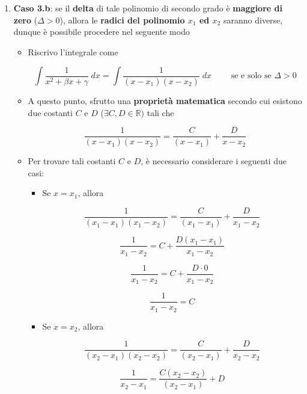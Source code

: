 \documentclass[a4paper, 12pt]{report}
\begin{document}
\begin{enumerate}
\begin{enumerate}
                \item \textbf{Caso 3.b}: se il \textbf{delta} di tale polinomio di secondo grado è \textbf{maggiore di zero} ($\Delta > 0$), allora le \textbf{radici del polinomio $x_1$ ed $x_2$} saranno diverse, dunque è possibile procedere nel seguente modo
                
                \begin{itemize}
                    \item Riscrivo l'integrale come
                    
                    \[ \int \frac{1}{x^2 + \beta x + \gamma} \; dx = \int \frac{1}{(x-x_1)(x-x_2)} \; dx \qquad \text{ se e solo se } \Delta > 0\]
                    
                    \item A questo punto, sfrutto una \textbf{proprietà matematica} secondo cui esistono due costanti $C$ e $D$ ($\exists C, D \in \mathbb{R})$ tali che
                    
                    \[ \frac{1}{(x-x_1)(x-x_2)} = \frac{C}{(x-x_1)}+ \frac{D}{x-x_2}\]
                
                    \item Per trovare tali costanti $C$ e $D$, è necessario considerare i seguenti due casi:
                    
                    \begin{itemize}
                        \item Se $x = x_1$, allora
                        
                        \[ \frac{1}{(x_1-x_1)(x_1-x_2)} = \frac{C}{(x_1-x_1)}+ \frac{D}{x_1-x_2}\]
                        
                        \[ \frac{1}{x_1-x_2} = C+ \frac{D(x_1-x_1)}{x_1-x_2}\]
                        
                        \[ \frac{1}{x_1-x_2} = C+ \frac{D \cdot 0}{x_1-x_2}\]
                        
                        \[ \frac{1}{x_1-x_2} = C\]
                        
                        \item Se $x = x_2$, allora
                        
                        \[ \frac{1}{(x_2-x_1)(x_2-x_2)} = \frac{C}{(x_2-x_1)}+ \frac{D}{x_2-x_2}\]
                        
                        \[ \frac{1}{x_2-x_1} = \frac{C(x_2-x_2)}{(x_2-x_1)}+D\]
                        

\end{itemize}
\end{itemize}
\end{enumerate}
\end{enumerate}
\end{document}
